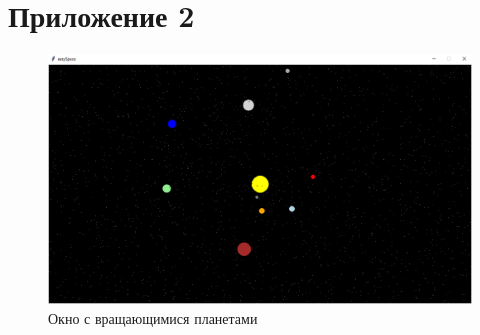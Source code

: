 \documentclass[11pt,a4paper]{report}
\begin{document}
\section{Приложение 2}

\begin{figure}[h]
\centering
\includegraphics[width=0.79\linewidth]{2.png}
\caption{Окно с вращающимися планетами}
\label{fig:mpr}
\end{figure}
\end{document}
